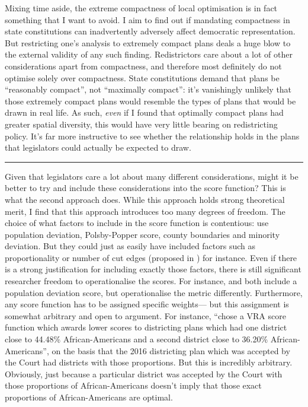 \documentclass[]{article}
\begin{document}
Mixing time aside, the extreme compactness of local optimisation is in
fact something that I want to avoid. I aim to find out if mandating
compactness in state constitutions can inadvertently adversely affect
democratic representation. But restricting one's analysis to extremely
compact plans deals a huge blow to the external validity of any such
finding. Redistrictors care about a lot of other considerations apart
from compactness, and therefore most definitely do not optimise solely
over compactness. State constitutions demand that plans be ``reasonably
compact'', not ``maximally compact'': it's vanishingly unlikely that
those extremely compact plans would resemble the types of plans that
would be drawn in real life. As such, \emph{even} if I found that
optimally compact plans had greater spatial diversity, this would have
very little bearing on redistricting policy. It's far more instructive
to see whether the relationship holds in the plans that legislators
could actually be expected to draw.

\begin{center}\rule{0.5\linewidth}{\linethickness}\end{center}

Given that legislators care a lot about many different considerations,
might it be better to try and include these considerations into the
score function? This is what the second approach does. While this
approach holds strong theoretical merit, I find that this approach
introduces too many degrees of freedom. The choice of what factors to
include in the score function is contentious: \citeauthor{h2018} use
population deviation, Polsby-Popper score, county boundaries and
minority deviation. But they could just as easily have included factors
such as proportionality or number of cut edges (proposed in
\cite{dc2016}) for instance. Even if there is a strong justification for
including exactly those factors, there is still significant researcher
freedom to operationalise the scores. For instance, \citeauthor{h2018}
and \citeauthor{dd2019va} both include a population deviation score, but
operationalise the metric differently. Furthermore, any score function
has to be assigned specific weights--- but this assignment is somewhat
arbitrary and open to argument. For instance, \citeauthor{h2018} ``chose
a VRA score function which awards lower scores to districting plans
which had one district close to 44.48\% African-Americans and a second
district close to 36.20\% African-Americans'', on the basis that the
2016 districting plan which was accepted by the Court had districts with
those proportions. But this is incredibly arbitrary. Obviously, just
because a particular district was accepted by the Court with those
proportions of African-Americans doesn't imply that those exact
proportions of African-Americans are optimal.
\end{document}
